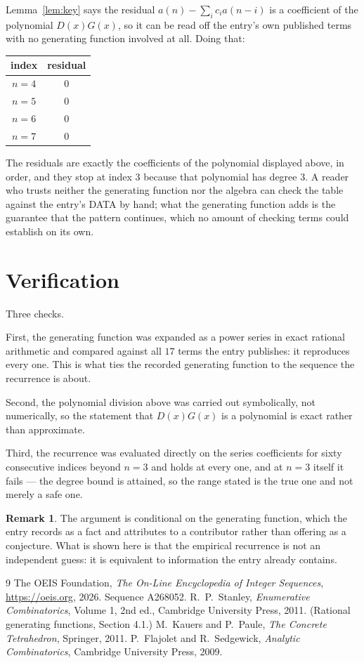 \documentclass[11pt,a4paper]{article}
\theoremstyle{plain}
\theoremstyle{definition}
\newtheorem{remark}[theorem]{Remark}
\begin{document}
Lemma~\ref{lem:key} says the residual $a(n)-\sum_ic_ia(n-i)$ is a coefficient of the
polynomial $D(x)G(x)$, so it can be read off the entry's own published terms with no
generating function involved at all. Doing that:
\begin{center}
\begin{tabular}{cc}
index & residual \\ \hline
$n=4$ & $0$ \\
$n=5$ & $0$ \\
$n=6$ & $0$ \\
$n=7$ & $0$
\end{tabular}
\end{center}
The residuals are exactly the coefficients of the polynomial displayed above, in order, and
they stop at index $3$ because that polynomial has degree $3$. A reader who trusts
neither the generating function nor the algebra can check the table against the entry's DATA
by hand; what the generating function adds is the guarantee that the pattern continues, which
no amount of checking terms could establish on its own.

\section{Verification}

Three checks.

First, the generating function was expanded as a power series in exact rational arithmetic and
compared against all $17$ terms the entry publishes: it reproduces every one. This is
what ties the recorded generating function to the sequence the recurrence is about.

Second, the polynomial division above was carried out symbolically, not numerically, so the
statement that $D(x)G(x)$ is a polynomial is exact rather than approximate.

Third, the recurrence was evaluated directly on the series coefficients for sixty consecutive
indices beyond $n=3$ and holds at every one, and at $n=3$ itself it fails --- the
degree bound is attained, so the range stated is the true one and not merely a safe one.

\begin{remark}
The argument is conditional on the generating function, which the entry records as a fact and
attributes to a contributor rather than offering as a conjecture. What is shown here is that
the empirical recurrence is not an independent guess: it is equivalent to information the
entry already contains.
\end{remark}

\begin{thebibliography}{9}
 The OEIS Foundation, \emph{The On-Line Encyclopedia of Integer
Sequences}, \url{https://oeis.org}, 2026. Sequence A268052.
 R.~P.~Stanley, \emph{Enumerative Combinatorics}, Volume 1, 2nd ed.,
Cambridge University Press, 2011. (Rational generating functions, Section 4.1.)
 M.~Kauers and P.~Paule, \emph{The Concrete Tetrahedron}, Springer, 2011.
 P.~Flajolet and R.~Sedgewick, \emph{Analytic Combinatorics}, Cambridge
University Press, 2009.
\end{thebibliography}
\end{document}
